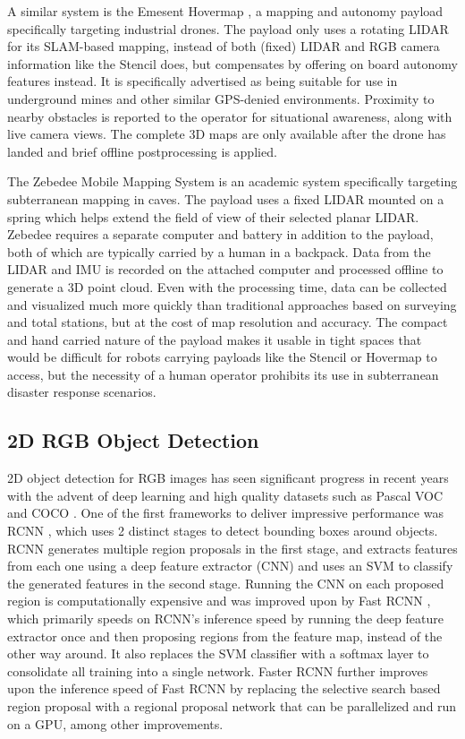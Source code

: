 A similar system is the Emesent Hovermap \cite{hovermap}, a mapping and autonomy payload specifically targeting industrial drones. The payload only uses a rotating LIDAR for its SLAM-based mapping, instead of both (fixed) LIDAR and RGB camera information like the Stencil does, but compensates by offering on board autonomy features instead. It is specifically advertised as being suitable for use in underground mines and other similar GPS-denied environments. Proximity to nearby obstacles is reported to the operator for situational awareness, along with live camera views. The complete 3D maps are only available after the drone has landed and brief offline postprocessing is applied.

The Zebedee Mobile Mapping System \cite{zlot2014three} is an academic system specifically targeting subterranean mapping in caves. The payload uses a fixed LIDAR mounted on a spring which helps extend the field of view of their selected planar LIDAR. Zebedee requires a separate computer and battery in addition to the payload, both of which are typically carried by a human in a backpack. Data from the LIDAR and IMU is recorded on the attached computer and processed offline to generate a 3D point cloud. Even with the processing time, data can be collected and visualized much more quickly than traditional approaches based on surveying and total stations, but at the cost of map resolution and accuracy. The compact and hand carried nature of the payload makes it usable in tight spaces that would be difficult for robots carrying payloads like the Stencil or Hovermap to access, but the necessity of a human operator prohibits its use in subterranean disaster response scenarios.

\subsection{2D RGB Object Detection}

2D object detection for RGB images has seen significant progress in recent years with the advent of deep learning and high quality datasets such as Pascal VOC \cite{everingham2010pascal} and COCO \cite{lin2014microsoft}. One of the first frameworks to deliver impressive performance was RCNN \cite{girshick2014rich}, which uses 2 distinct stages to detect bounding boxes around objects. RCNN generates multiple region proposals in the first stage, and extracts features from each one using a deep feature extractor (CNN) and uses an SVM to classify the generated features in the second stage. Running the CNN on each proposed region is computationally expensive and was improved upon by Fast RCNN \cite{girshick2015fast}, which primarily speeds on RCNN's inference speed by running the deep feature extractor once and then proposing regions from the feature map, instead of the other way around. It also replaces the SVM classifier with a softmax layer to consolidate all training into a single network. Faster RCNN \cite{ren2015faster} further improves upon the inference speed of Fast RCNN by replacing the selective search based region proposal with a regional proposal network that can be parallelized and run on a GPU, among other improvements.

